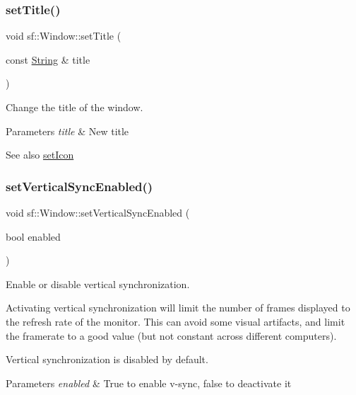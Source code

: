 \subsubsection{\texorpdfstring{set\+Title()}{setTitle()}}
{\footnotesize\ttfamily void sf\+::\+Window\+::set\+Title (\begin{DoxyParamCaption}\item[{const \hyperlink{classsf_1_1_string}{String} \&}]{title }\end{DoxyParamCaption})}



Change the title of the window. 


\begin{DoxyParams}{Parameters}
{\em title} & New title\\
\hline
\end{DoxyParams}
\begin{DoxySeeAlso}{See also}
\hyperlink{classsf_1_1_window_a63af61e026fba08e3153fd013620bcc0}{set\+Icon} 
\end{DoxySeeAlso}
\mbox{\label{classsf_1_1_window_a59041c4556e0351048f8aff366034f61}} 
\subsubsection{\texorpdfstring{set\+Vertical\+Sync\+Enabled()}{setVerticalSyncEnabled()}}
{\footnotesize\ttfamily void sf\+::\+Window\+::set\+Vertical\+Sync\+Enabled (\begin{DoxyParamCaption}\item[{bool}]{enabled }\end{DoxyParamCaption})}



Enable or disable vertical synchronization. 

Activating vertical synchronization will limit the number of frames displayed to the refresh rate of the monitor. This can avoid some visual artifacts, and limit the framerate to a good value (but not constant across different computers).

Vertical synchronization is disabled by default.


\begin{DoxyParams}{Parameters}
{\em enabled} & True to enable v-\/sync, false to deactivate it \\
\hline
\end{DoxyParams}
\mbox{\label{classsf_1_1_window_a160f7f11a207603d7e99ce606e749703}} 
